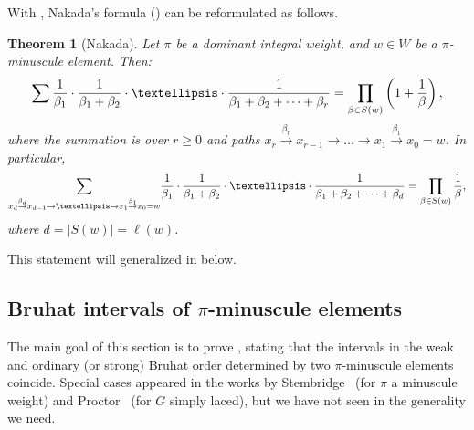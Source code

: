 \documentclass[11pt]{article}
\newtheorem{theorem}[theo]{Theorem}
\theoremstyle{definition}
\numberwithin{equation}{section}
\begin{document}
With , Nakada's formula () can be reformulated as follows.
\begin{theorem}[Nakada]\label{thm:anotherform}
	Let $\pi$ be a dominant integral weight, and $w\in W$ be a $\pi$-minuscule element. Then: 
	\[ \sum \frac{1}{\beta_1}\cdot \frac{1}{\beta_1+\beta_2}\cdot \ldots \cdot\frac{1}{\beta_1+\beta_2+\cdots +\beta_r}
	=\prod_{\beta\in S(w)}\left(1+\frac{1}{\beta}\right) \/,
	\] where the summation is over $r \ge 0$ and paths $x_r\overset{\beta_r}{\to} x_{r-1}\to \ldots \to x_1\overset{\beta_1}{\to} x_0=w$.
	In particular, 
	$$
	{\sum_{x_d\overset{\beta_d}{\to} x_{d-1}\to \ldots \to x_1\overset{\beta_1}{\to} x_0=w\/}}
	\frac{1}{\beta_1}\cdot \frac{1}{\beta_1+\beta_2}\cdot \ldots \cdot \frac{1}{\beta_1+\beta_2+\cdots +\beta_d}
	=\prod_{\beta\in S(w)}\frac{1}{\beta},
	$$
	where $d=|S(w)|{= \ell(w)}$.
\end{theorem}
This statement will generalized in  below.

\subsection{Bruhat intervals of \texorpdfstring{$\pi$}{pi}-minuscule elements}\label{sec:minuscule-intervals}
The main goal of this section is to prove , stating that the intervals in the weak and ordinary (or strong) Bruhat
order determined by two $\pi$-minuscule elements coincide. Special cases appeared
in the works by Stembridge~\cite[Thm.~7.1]{stembridge:fullycomm} (for $\pi$ a minuscule weight) and Proctor~\cite[\S 10]{proctor:minuscule} (for $G$ simply laced),
but we have not seen  in the generality we need.
\end{document}
